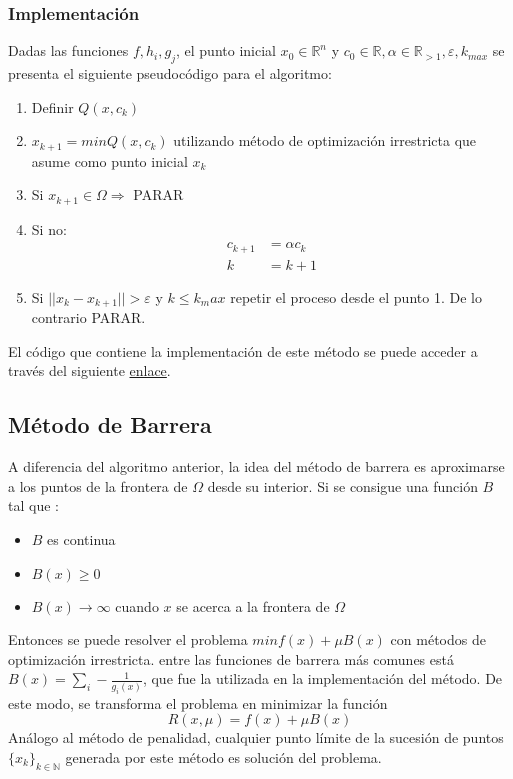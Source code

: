 \documentclass[titlepage, 11pt]{scrartcl}
\begin{document}
	\subsubsection{Implementación}
	Dadas las funciones $f, h_i, g_j$, el punto inicial $x_0 \in \mathbb{R}^n$ y $c_0 \in \mathbb{R}, \alpha \in \mathbb{R}_{> 1}, \varepsilon, k_{max}$ se presenta el siguiente pseudocódigo para el algoritmo:
	\begin{enumerate}
		\item Definir $Q(x, c_k)$
		\item $x_{k + 1} = min Q(x, c_k)$ utilizando método de optimización irrestricta que asume como punto inicial $x_k$
		\item Si $x_{k + 1} \in \Omega \Rightarrow$ PARAR
		\item Si no: 
		\begin{align*}
			c_{k + 1} &= \alpha c_k\\
			k &= k + 1
		\end{align*}
		\item Si $||x_k - x_{k+ 1}|| > \varepsilon$ y $k \leq k_max$ repetir el proceso desde el punto 1. De lo contrario PARAR.
	\end{enumerate}

	El código que contiene la implementación de este método se puede acceder a través del siguiente \href{methods.py}{enlace}.
	
	\subsection{Método de Barrera}
	A diferencia del algoritmo anterior, la idea del método de barrera es aproximarse a los puntos de la frontera de $\Omega$ desde su interior. Si se consigue una función $B$ tal que :
	\begin{itemize}
		\item $B$ es continua
		\item $B(x) \geq 0$
		\item $B(x) \rightarrow \infty$ cuando $x$ se acerca a la frontera de $\Omega$
	\end{itemize}
	Entonces se puede resolver el problema $min f(x) + \mu B(x)$ con métodos de optimización irrestricta. entre las funciones de barrera más comunes está $B(x) = \sum_{i}-\frac{1}{g_i(x)}$, que fue la utilizada en la implementación del método. De este modo, se transforma el problema en minimizar la función
	\begin{equation*}
		R(x, \mu) = f(x) + \mu B(x)
	\end{equation*}
	Análogo al método de penalidad, cualquier punto límite de la sucesión de puntos $\{x_k\}_{k \in \mathbb{N}}$ generada por este método es solución del problema.
	
\end{document}
